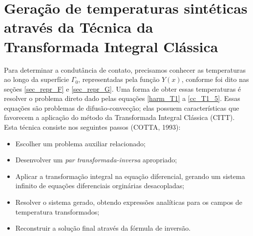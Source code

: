 \newpage

\section{Geração de temperaturas sintéticas através da Técnica da Transformada Integral Clássica}\label{sec_sol_prob_direto}
Para determinar a condutância de contato, precisamos conhecer as temperaturas ao longo da superfície $\Gamma_0$, representadas
pela função $Y(x)$, conforme foi dito nas seções \ref{sec_repr_F} e \ref{sec_repr_G}. Uma forma de obter essas temperaturas é
resolver o problema direto dado pelas equações \eqref{harm_T1} a \eqref{cc_T1_5}.
Essas equações são problemas de difusão-convecção; elas possuem características que favorecem a aplicação do método da
Transformada Integral Clássica (CITT). Esta técnica consiste nos seguintes passos (COTTA, 1993):%
\begin{itemize}
  \item Escolher um problema auxiliar relacionado;
  \item Desenvolver um \textit{par transformada-inversa} apropriado;
  \item Aplicar a transformação integral na equação diferencial, gerando um sistema infinito de equações diferenciais orginárias desacopladas;
  \item Resolver o sistema gerado, obtendo expressões analíticas para os campos de temperatura transformados; 
  \item Reconstruir a solução final através da fórmula de inversão. 
\end{itemize}

